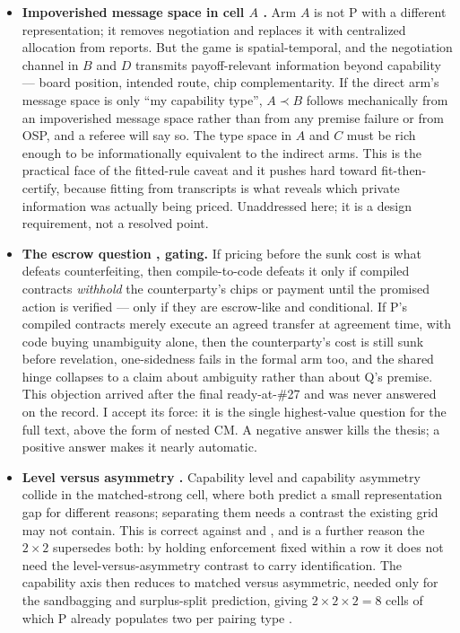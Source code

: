 \documentclass{article}
\begin{document}
\begin{itemize}
\item \textbf{Impoverished message space in cell \(A\) .} Arm \(A\) is not P with a different representation; it removes negotiation and replaces it with centralized allocation from reports. But the game is spatial-temporal, and the negotiation channel in \(B\) and \(D\) transmits payoff-relevant information beyond capability --- board position, intended route, chip complementarity. If the direct arm's message space is only ``my capability type'', \(A \prec B\) follows mechanically from an impoverished message space rather than from any premise failure or from OSP, and a referee will say so. The type space in \(A\) and \(C\) must be rich enough to be informationally equivalent to the indirect arms. This is the practical face of the fitted-rule caveat and it pushes hard toward fit-then-certify, because fitting from transcripts is what reveals which private information was actually being priced. Unaddressed here; it is a design requirement, not a resolved point.

\item \textbf{The escrow question , gating.} If pricing before the sunk cost is what defeats counterfeiting, then compile-to-code defeats it only if compiled contracts \emph{withhold} the counterparty's chips or payment until the promised action is verified --- only if they are escrow-like and conditional. If P's compiled contracts merely execute an agreed transfer at agreement time, with code buying unambiguity alone, then the counterparty's cost is still sunk before revelation, one-sidedness fails in the formal arm too, and the shared hinge collapses to a claim about ambiguity rather than about Q's premise. This objection arrived after the final ready-at-\#27 and was never answered on the record. I accept its force: it is the single highest-value question for the full text, above the form of nested CM. A negative answer kills the thesis; a positive answer makes it nearly automatic.

\item \textbf{Level versus asymmetry .} Capability level and capability asymmetry collide in the matched-strong cell, where both predict a small representation gap for different reasons; separating them needs a contrast the existing grid may not contain. This is correct against  and , and is a further reason the \(2 \times 2\) supersedes both: by holding enforcement fixed within a row it does not need the level-versus-asymmetry contrast to carry identification. The capability axis then reduces to matched versus asymmetric, needed only for the sandbagging and surplus-split prediction, giving \(2 \times 2 \times 2 = 8\) cells of which P already populates two per pairing type .


\end{itemize}
\end{document}

